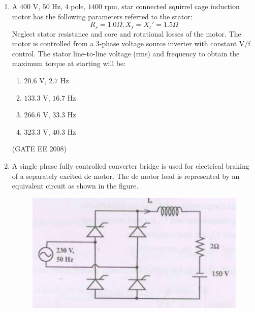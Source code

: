 \documentclass[journal,12pt,onecolumn]{IEEEtran}
\theoremstyle{remark}
\begin{document}
\begin{enumerate}[start=1, label=Q.\arabic*]
The inverter is operated at 50 Hz in $180\degree$ square wave mode. Assume that the load current does not have any dc component. The peak value of the inductor current $i_o$ will be

\begin{multicols}{4}
\begin{enumerate}
    \item $6.37$ A
    \item $10$ A
    \item $20$ A
    \item $40$ A
\end{enumerate}
\end{multicols}
\hfill (GATE EE 2008)


\item A $400$ V, $50$ Hz, $4$ pole, $1400$ rpm, star connected squirrel cage induction motor has the following parameters referred to the stator:
$$
R_s = 1.0 \Omega, X_s = X_r' = 1.5 \Omega
$$
Neglect stator resistance and core and rotational losses of the motor.
The motor is controlled from a 3-phase voltage source inverter with constant V/f control. The stator line-to-line voltage (rms) and frequency to obtain the maximum torque at starting will be:

\begin{multicols}{4}
\begin{enumerate}
    \item $20.6$ V, $2.7$ Hz
    \item $133.3$ V, $16.7$ Hz
    \item $266.6$ V, $33.3$ Hz
    \item $323.3$ V, $40.3$ Hz
\end{enumerate}
\end{multicols}
\hfill (GATE EE 2008)



\item A single phase fully controlled converter bridge is used for electrical braking of a separately excited dc motor. The dc motor load is represented by an equivalent circuit as shown in the figure.

\begin{figure}[H]
    \centering
    \includegraphics[width=\columnwidth]{Fig/q61.png}
    \caption{}
\end{figure}


\end{enumerate}
\end{document}
